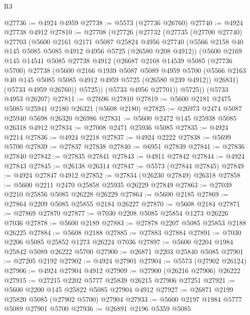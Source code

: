 \begin{lexlean}{R3}
\begin{coremodule}
@27736 := @4924 @4959
@27738 := @5573 (@27736 @26760)
@27740 := @4924 @27738 @4912
@27810 := @27708
    (@27726
      (@27732
        (@27735
          (@27700 @27740)
          @27703
          (@5600
            @2161
            @2171
            @5087
            @25824
            @4956
            @27740
            (@5566 @2158 @40 @145 @5085 @5085 @4912 @4956 @5725 (@26580 @208 @4912))
            (@5600
              @2169
              @145
              @14541
              @5085
              @27738
              @4912
              (@26687
                @2168
                @14539
                @5085
                (@27736 @5700)
                @27738
                (@5600
                  @2166
                  @1939
                  @5087
                  @5089
                  @4959
                  @5700
                  (@5566 @2163 @40 @145 @5085 @5085 @4912 @4959 @5725 (@26580 @239 @4912))
                  @26831)
                (@5733 @4959 @26760))
              @5725))
          (@5733 @4956 @27701))
        @5725))
    (@5733 @4953 @26207)
@27811 := @27696 @27810
@27819 := @5600 @2181 @2475 @5085 @25941 @2180 @26321 (@5608 @2180)
@27825 := @26973 @2474 @5087 @25940 @5698 @26320 @26986
@27831 := @5600 @2472 @145 @25938 @5085 @26318 @4912
@27834 := @27008 @2471 @25936 @5085
@27835 := @4924 @2214
@27836 := @4924 @2218
@27837 := @4924 @2222
@27838 := @5699 @5700
@27839 := @27837 @27838
@27840 := @6951 @27839
@27841 := @27836 @27840
@27842 := @27835 @27841
@27843 := @4911 @27842
@27844 := @4924 @27843
@27845 := @26138 @26314
@27847 := @5573 (@27844 @27845)
@27849 := @4924 @27847 @4912
@27852 := @27834 (@26230 @27849) @26318
@27858 := @5600 @2211 @2470 @25858 @25935 @26229 @27849
@27863 := @27039 @2210 @25856 @5085 @26228 @26229
@27864 := @5600 @2185
@27869 := @27864 @2209 @5085 @25855 @2184 @26227
@27870 := @5608 @2184
@27871 := @27869 @27870
@27877 := @7030 @2208 @5085 @25854 @1273 @26226 @7036
@27878 := @5600 @2189
@27883 := @27878 @2207 @5085 @25853 @2188 @26225
@27884 := @5608 @2188
@27885 := @27883 @27884
@27891 := @7030 @2206 @5085 @25852 @1273 @26224 @7036
@27897 := @5600 @2204 @1984 @25842 @5089 @26222 @5700
@27900 := @26871 @2203 @25840 @5085
@27901 := @27205 @2192
@27902 := @4924 @27901
@27904 := @5573 (@27902 @26124)
@27906 := @4924 @27904 @4912
@27909 := @27900 (@26216 @27906) @26222
@27915 := @27215 @2202 @5777 @25839 @26215 @27906 @27251
@27921 := @5600 @2200 @145 @25822 @5085 @27904 @4912
@27927 := @26871 @2199 @25820 @5085 (@27902 @5700) @27904
@27933 := @5600 @2197 @1984 @5777 @5089 @27901 @5700
@27936 := @26891 @2196 @5359 @5085

\end{coremodule}
\end{lexlean}
